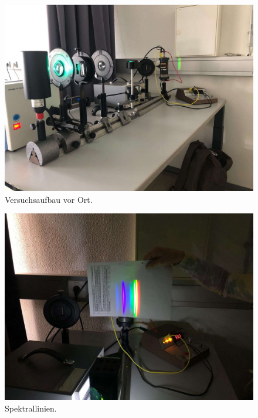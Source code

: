 \begin{figure}
    \centering
    \includegraphics[width =\textwidth]{content/aufbaufotot.pdf}
    \caption{Versuchsaufbau vor Ort.}
    \label{fig:aufbau}
\end{figure}

\begin{figure}
    \centering
    \includegraphics[width =\textwidth]{content/farben.pdf}
    \caption{Spektrallinien.}
    \label{fig:farben}
\end{figure}